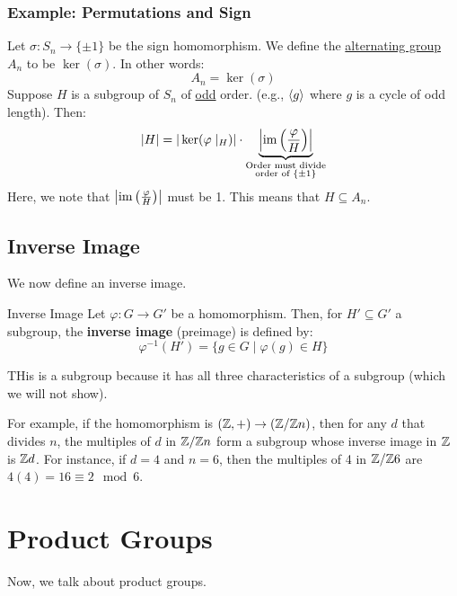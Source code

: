 \documentclass[letterpaper]{article}
\begin{document}
\subsubsection{Example: Permutations and Sign}
Let $\sigma: S_n \to \{\pm 1\}$ be the sign homomorphism. We define the \underline{alternating group} $A_n$ to be $\ker(\sigma)$. In other words:
\[A_n = \ker(\sigma)\]
Suppose $H$ is a subgroup of $S_n$ of \underline{odd} order. (e.g., $\langle g \rangle$ where $g$ is a cycle of odd length). Then: 
\[|H| = |\ker(\varphi \mid_H)| \cdot \underbrace{\left|\operatorname{im}\left(\frac{\varphi}{H}\right)\right|}_{\substack{\text{Order must divide} \\ \text{order of } \{\pm 1\}}}\]
Here, we note that $\left|\operatorname{im}\left(\frac{\varphi}{H}\right)\right|$ must be 1. This means that $H \subseteq A_n$. 

\subsection{Inverse Image}
We now define an inverse image.
\begin{definition}{Inverse Image}{}
    Let $\varphi: G \to G'$ be a homomorphism. Then, for $H' \subseteq G'$ a subgroup, the \textbf{inverse image} (preimage) is defined by: 
\[\varphi^{-1}(H') = \{g \in G \mid \varphi(g) \in H\}\]
\end{definition}
THis is a subgroup because it has all three characteristics of a subgroup (which we will not show). 

\bigskip

For example, if the homomorphism is $(\mathbb{Z}, +) \to (\mathbb{Z} / \mathbb{Z} n)$, then for any $d$ that divides $n$, the multiples of $d$ in $\mathbb{Z} / \mathbb{Z} n$ form a subgroup whose inverse image in $\mathbb{Z}$ is $\mathbb{Z} d$. For instance, if $d = 4$ and $n = 6$, then the multiples of 4 in $\mathbb{Z} / \mathbb{Z} 6$ are $4(4) = 16 \equiv 2 \mod{6}$. 










\newpage 
\section{Product Groups}
Now, we talk about product groups. 
\end{document}

